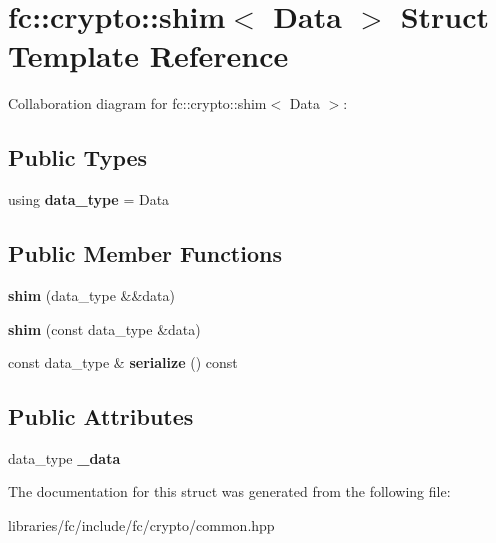 \hypertarget{structfc_1_1crypto_1_1shim}{}\section{fc\+:\+:crypto\+:\+:shim$<$ Data $>$ Struct Template Reference}
\label{structfc_1_1crypto_1_1shim}


Collaboration diagram for fc\+:\+:crypto\+:\+:shim$<$ Data $>$\+:
\subsection*{Public Types}
\begin{DoxyCompactItemize}
\item 
\mbox{\label{structfc_1_1crypto_1_1shim_af49214f775b60b76c4826a2c988471cf}} 
using {\bfseries data\+\_\+type} = Data
\end{DoxyCompactItemize}
\subsection*{Public Member Functions}
\begin{DoxyCompactItemize}
\item 
\mbox{\label{structfc_1_1crypto_1_1shim_a7aa30b3f06fd5178b96e9a218a763b82}} 
{\bfseries shim} (data\+\_\+type \&\&data)
\item 
\mbox{\label{structfc_1_1crypto_1_1shim_afcd3504a5af0edddcf383efeb89c0acd}} 
{\bfseries shim} (const data\+\_\+type \&data)
\item 
\mbox{\label{structfc_1_1crypto_1_1shim_a6fadb8e195a8b28e4ce4e3933aeaedae}} 
const data\+\_\+type \& {\bfseries serialize} () const
\end{DoxyCompactItemize}
\subsection*{Public Attributes}
\begin{DoxyCompactItemize}
\item 
\mbox{\label{structfc_1_1crypto_1_1shim_ab5bbf7c7dffffb514761aa79ddbb2079}} 
data\+\_\+type {\bfseries \+\_\+data}
\end{DoxyCompactItemize}


The documentation for this struct was generated from the following file\+:\begin{DoxyCompactItemize}
\item 
libraries/fc/include/fc/crypto/common.\+hpp\end{DoxyCompactItemize}
